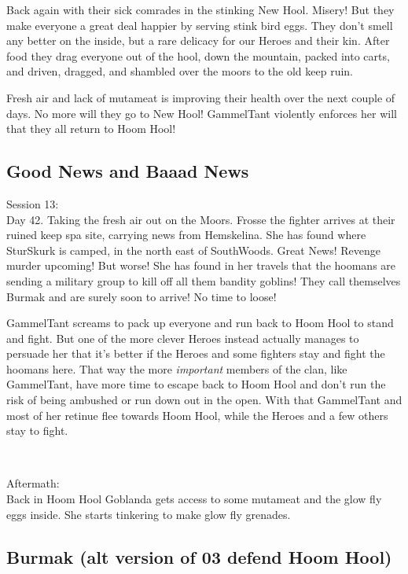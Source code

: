 Back again with their sick comrades in the stinking New Hool. Misery! But they make everyone a great deal happier by serving stink bird eggs. They don't smell any better on the inside, but a rare delicacy for our Heroes and their kin. After food they drag everyone out of the hool, down the mountain, packed into carts, and driven, dragged, and shambled over the moors to the old keep ruin.

Fresh air and lack of mutameat is improving their health over the next couple of days. No more will they go to New Hool! GammelTant violently enforces her will that they all return to Hoom Hool!


\subsection*{Good News and Baaad News}

\forceindent Session 13:\\                                              %
Day 42. Taking the fresh air out on the Moors. Frosse the fighter arrives at their ruined keep spa site, carrying news from Hemskelina. She has found where SturSkurk is camped, in the north east of SouthWoods. Great News! Revenge murder upcoming!
But worse! She has found in her travels that the hoomans are sending a military group to kill off all them bandity goblins! They call themselves Burmak and are surely soon to arrive! No time to loose!

GammelTant screams to pack up everyone and run back to Hoom Hool to stand and fight. But one of the more clever Heroes instead actually manages to persuade her that it's better if the Heroes and some fighters stay and fight the hoomans here. That way the more \emph{important} members of the clan, like GammelTant, have more time to escape back to Hoom Hool and don't run the risk of being ambushed or run down out in the open.
With that GammelTant and most of her retinue flee towards Hoom Hool, while the Heroes and a few others stay to fight.

\

Aftermath:\\
Back in Hoom Hool Goblanda gets access to some mutameat and the glow fly eggs inside. She starts tinkering to make glow fly grenades.


\subsection*{Burmak (alt version of 03 defend Hoom Hool)}

